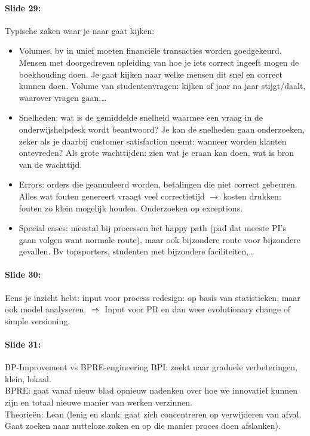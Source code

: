 \documentclass[10pt,a4paper]{report}
\begin{document}
\paragraph{Slide 29:}Typische zaken waar je naar gaat kijken:
\begin{itemize}
\item Volumes, bv in unief moeten financiële transacties worden goedgekeurd. Mensen met doorgedreven opleiding van hoe je iets correct ingeeft mogen de boekhouding doen. Je gaat kijken naar welke mensen dit snel en correct kunnen doen. Volume van studentenvragen: kijken of jaar na jaar stijgt/daalt, waarover vragen gaan,\ldots
\item Snelheden: wat is de gemiddelde snelheid waarmee een vraag in de onderwijshelpdesk wordt beantwoord? Je kan de snelheden gaan onderzoeken, zeker als je daarbij customer satisfaction neemt: wanneer worden klanten ontevreden? Als grote wachttijden: zien wat je eraan kan doen, wat is bron van de wachttijd.
\item Errors: orders die geannuleerd worden, betalingen die niet correct gebeuren. Alles wat fouten genereert vraagt veel correctietijd $\rightarrow$ kosten drukken: fouten zo klein mogelijk houden. Onderzoeken op exceptions.
\item Special cases: meestal bij processen het happy path (pad dat meeste PI's gaan volgen want normale route), maar ook bijzondere route voor bijzondere gevallen. Bv topsporters, studenten met bijzondere faciliteiten,…
\end{itemize}	
	
\paragraph{Slide 30:}Eens je inzicht hebt: input voor process redesign: op basis van statistieken, maar ook model analyseren. $\Rightarrow$ Input voor PR en dan weer evolutionary change of simple versioning.

\paragraph{Slide 31:} BP-Improvement vs BPRE-engineering BPI: zoekt naar graduele verbeteringen, klein, lokaal.\\
BPRE: gaat vanaf nieuw blad opnieuw nadenken over hoe we innovatief kunnen zijn en totaal nieuwe manier van werken verzinnen.\\
Theorieën: Lean (lenig en slank: gaat zich concentreren op verwijderen van afval. Gaat zoeken naar nutteloze zaken en op die manier proces doen afslanken).
\end{document}
